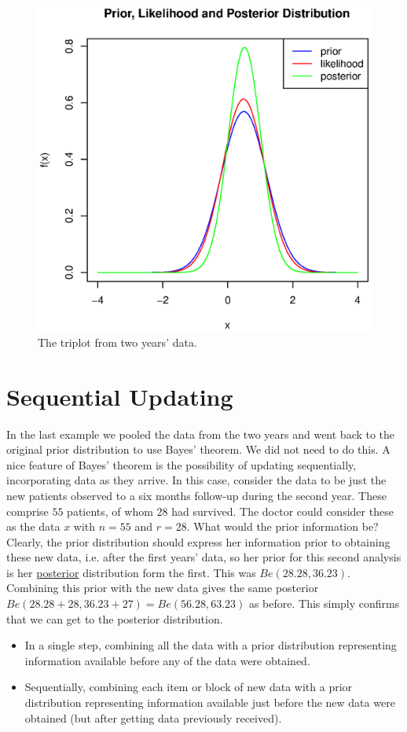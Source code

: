 \documentclass[lecture,12pt,]{pcms-l}
\numberwithin{section}{chapter}
\numberwithin{equation}{chapter}
\theoremstyle{plain}
\theoremstyle{definition}
\theoremstyle{definition}
\begin{document}
\begin{figure}
\centering
 \includegraphics[scale=0.6]{triplot_v2}%
  \caption{The triplot from two years' data. }
\label{fig:TwoTriplot}
\end{figure} 

\newpage
\section{Sequential Updating}

In the last example we pooled the data from the two years and went back to the original prior distribution to use Bayes' theorem. We did not need to do this. A nice feature of Bayes' theorem is the possibility of updating sequentially, incorporating data as they arrive. In this case, consider the data to be just the new patients observed to a six months follow-up during the second year. These comprise $55$ patients, of whom $28$ had survived. The doctor could consider these as the data $x$ with $n=55$ and $r=28$. What would the prior information be?
\\
Clearly, the prior distribution should express her information prior to obtaining these new data, i.e. after the first years' data, so her prior for this second analysis is her \underline{posterior} distribution form the first. This was $Be(28.28,36.23)$. Combining this prior with the new data gives the same posterior $Be(28.28+28,36.23+27)=Be(56.28,63.23)$ as before. This simply confirms that we can get to the posterior distribution.
\begin{itemize}
\item In a single step, combining all the data with a prior distribution representing information available before any of the data were obtained.
\item Sequentially, combining each item or block of new data with a prior distribution representing information available just before the new data were obtained (but after getting data previously received).
\end{itemize}
\end{document}
